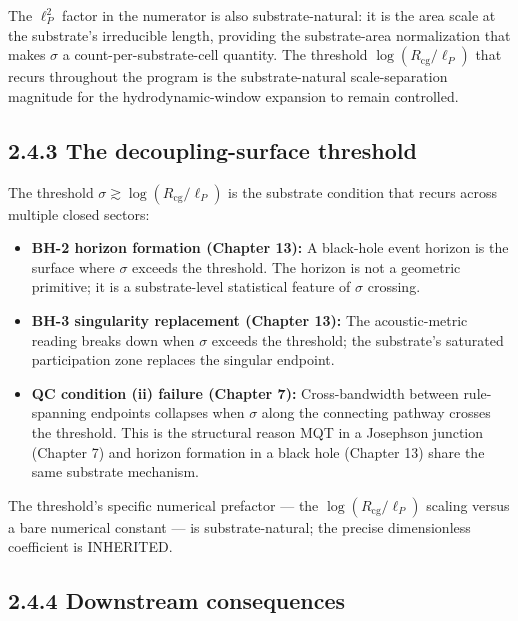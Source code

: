 \documentclass[11pt]{book}
\begin{document}
The $\ell_P^2$ factor in the numerator is also substrate-natural: it is the area scale at the substrate's irreducible length, providing the substrate-area normalization that makes $\sigma$ a count-per-substrate-cell quantity. The threshold $\log(R_\mathrm{cg}/\ell_P)$ that recurs throughout the program is the substrate-natural scale-separation magnitude for the hydrodynamic-window expansion to remain controlled.

\subsection{2.4.3 The decoupling-surface threshold}

The threshold $\sigma \gtrsim \log(R_\mathrm{cg}/\ell_P)$ is the substrate condition that recurs across multiple closed sectors:

\begin{itemize}
\item \textbf{BH-2 horizon formation (Chapter 13):} A black-hole event horizon is the surface where $\sigma$ exceeds the threshold. The horizon is not a geometric primitive; it is a substrate-level statistical feature of $\sigma$ crossing.
\item \textbf{BH-3 singularity replacement (Chapter 13):} The acoustic-metric reading breaks down when $\sigma$ exceeds the threshold; the substrate's saturated participation zone replaces the singular endpoint.
\item \textbf{QC condition (ii) failure (Chapter 7):} Cross-bandwidth between rule-spanning endpoints collapses when $\sigma$ along the connecting pathway crosses the threshold. This is the structural reason MQT in a Josephson junction (Chapter 7) and horizon formation in a black hole (Chapter 13) share the same substrate mechanism.
\end{itemize}

The threshold's specific numerical prefactor — the $\log(R_\mathrm{cg}/\ell_P)$ scaling versus a bare numerical constant — is substrate-natural; the precise dimensionless coefficient is INHERITED.

\subsection{2.4.4 Downstream consequences}
\end{document}
